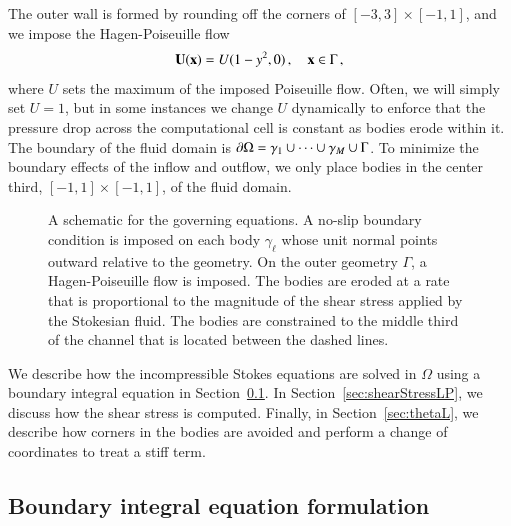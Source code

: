 \documentclass[preprint, 10pt]{elsarticle}
\begin{document}
The outer wall is formed by rounding off the corners
of $[-3,3] \times [-1,1]$, and we impose the Hagen-Poiseuille flow
\begin{align}
  {\mathbf{U}}({\mathbf{x}}) = U (1-y^2,0)\, , \quad {\mathbf{x}} \in \Gamma\, ,
\end{align}
where $U$ sets the maximum of the imposed Poiseuille flow. Often, we
will simply set $U=1$, but in some instances we change $U$ dynamically
to enforce that the pressure drop across the computational cell is
constant as bodies erode within it.  The boundary of the fluid domain is
${\partial}\Omega = \gamma_1 \cup \cdots \cup \gamma_M \cup \Gamma$.  To
minimize the boundary effects of the inflow and outflow, we only place
bodies in the center third, $[-1,1] \times [-1,1]$, of the fluid domain.

\begin{figure}[htpb]
  \centering
  
  \caption{\label{fig:schematic} A schematic for the governing
    equations.  A no-slip boundary condition is imposed on each body
    $\gamma_\ell$ whose unit normal points outward relative to the
    geometry.  On the outer geometry $\Gamma$, a Hagen-Poiseuille flow
    is imposed.  The bodies are eroded at a rate that is proportional to
    the magnitude of the shear stress applied by the Stokesian fluid.
    The bodies are constrained to the middle third of the channel that
    is located between the dashed lines.}
\end{figure}

We describe how the incompressible Stokes equations are solved in
$\Omega$ using a boundary integral equation in Section~\ref{sec:bies}.
In Section~\ref{sec:shearStressLP}, we discuss how the shear stress is
computed.  Finally, in Section~\ref{sec:thetaL}, we describe how corners
in the bodies are avoided and perform a change of coordinates to treat
a stiff term.


\subsection{Boundary integral equation formulation} 
\label{sec:bies}
\end{document}
